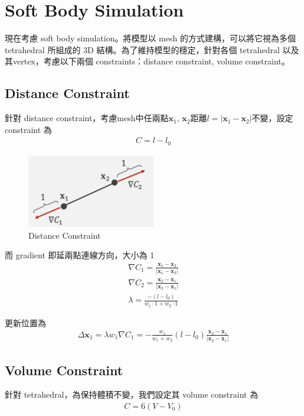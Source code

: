 \documentclass{article}
\begin{document}
\section*{Soft Body Simulation}

現在考慮 soft body simulation。將模型以 mesh 的方式建構，可以將它視為多個 tetrahedral 所組成的 3D 結構。為了維持模型的穩定，針對各個 tetrahedral 以及其vertex，考慮以下兩個 constraints：distance constraint, volume constraint。

\subsection*{Distance Constraint}
針對 distance constraint，考慮mesh中任兩點$\mathbf{x}_1$, $\mathbf{x}_2$距離$l = \left|\mathbf{x}_1 - \mathbf{x}_2\right|$不變，設定 constraint 為
\begin{align}
  C = l - l_0 \label{eq:Dis}
\end{align}

\begin{figure}[!ht]
  \centering
  \includegraphics[width=0.5\textwidth]{./figures/distanceConstraint.png}
  \caption{Distance Constraint}
  \label{fig:Dis}
\end{figure}

而 gradient 即延兩點連線方向，大小為 1
\begin{align}
  \nabla C_1 = \frac{\mathbf{x}_1 - \mathbf{x}_2}{\left|\mathbf{x}_1 - \mathbf{x}_2\right|} \\
  \nabla C_2 = \frac{\mathbf{x}_2 - \mathbf{x}_1}{\left|\mathbf{x}_2 - \mathbf{x}_1\right|} \\
  \lambda = \frac{-(l-l_0)}{w_1\cdot 1 + w_2 \cdot 1}
\end{align}

更新位置為
\begin{align}
  \Delta \mathbf{x}_1 = \lambda w_1 \nabla C_1
  = - \frac{w_1}{w_1 + w_2} (l - l_0) \frac{\mathbf{x}_2 - \mathbf{x}_1}{\left|\mathbf{x}_2 - \mathbf{x}_1\right|}
\end{align}

\subsection*{Volume Constraint}
針對 tetrahedral，為保持體積不變，我們設定其 volume constraint 為
\begin{align}
  C = 6(V - V_0)
\end{align}
\end{document}
